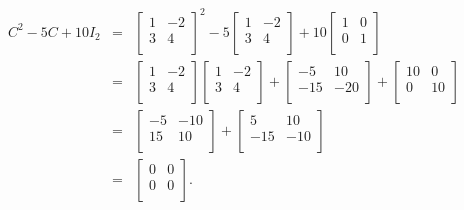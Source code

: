 \documentclass{ximera}
\begin{document}
\begin{example}
\begin{enumerate}
\[\begin{array}{rcl}
C^2 -5C + 10I_{2} & = & \left[ \begin{array}{rr} 1 & -2 \\ 3 & 4 \\ \end{array} \right]^2 - 5 \left[ \begin{array}{rr} 1 & -2 \\ 3 & 4 \\ \end{array} \right] + 10 \left[ \begin{array}{rr} 1 & 0 \\ 0 & 1 \\ \end{array} \right] \\  

& = & \left[ \begin{array}{rr} 1 & -2 \\ 3 & 4 \\ \end{array} \right]\left[ \begin{array}{rr} 1 & -2 \\ 3 & 4 \\ \end{array} \right] + \left[ \begin{array}{rr} -5 & 10 \\ -15 & -20 \\ \end{array} \right] + \left[ \begin{array}{rr} 10 & 0 \\ 0 & 10 \\ \end{array} \right] \\  

& = & \left[ \begin{array}{rr} -5 & -10 \\ 15 & 10 \\ \end{array} \right] + \left[ \begin{array}{rr} 5 & 10 \\ -15 & -10 \\ \end{array} \right]  \\  

& = &  \left[ \begin{array}{rr} 0 & 0 \\ 0 & 0 \\ \end{array} \right]. \\



\end{array}\]
\end{enumerate}
\end{example}
\end{document}
